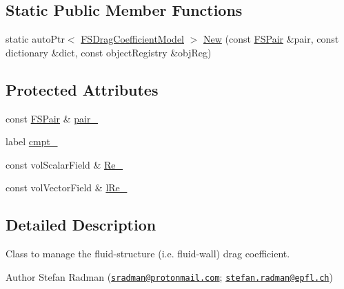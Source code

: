 \subsection*{Static Public Member Functions}
\begin{DoxyCompactItemize}
\item 
static auto\+Ptr$<$ \hyperlink{classFoam_1_1FSDragCoefficientModel}{F\+S\+Drag\+Coefficient\+Model} $>$ \hyperlink{classFoam_1_1FSDragCoefficientModel_a96a7d5b462837913e40f9e13072e927c}{New} (const \hyperlink{classFoam_1_1FSPair}{F\+S\+Pair} \&pair, const dictionary \&dict, const object\+Registry \&obj\+Reg)
\end{DoxyCompactItemize}
\subsection*{Protected Attributes}
\begin{DoxyCompactItemize}
\item 
const \hyperlink{classFoam_1_1FSPair}{F\+S\+Pair} \& \hyperlink{classFoam_1_1FSDragCoefficientModel_a587e19a1b4f4b498d2604d20c093a73b}{pair\+\_\+}
\item 
label \hyperlink{classFoam_1_1FSDragCoefficientModel_af2a0c78856a3dbdc3cb25d9e8e0ee0d7}{cmpt\+\_\+}
\item 
const vol\+Scalar\+Field \& \hyperlink{classFoam_1_1FSDragCoefficientModel_a048c59a4c6018dbef125c5d840ada714}{Re\+\_\+}
\item 
const vol\+Vector\+Field \& \hyperlink{classFoam_1_1FSDragCoefficientModel_a749dc262c8ea770eb61b5d6302d0a0c6}{l\+Re\+\_\+}
\end{DoxyCompactItemize}


\subsection{Detailed Description}
Class to manage the fluid-\/structure (i.\+e. fluid-\/wall) drag coefficient. 

\label{_Description}%
 Author Stefan Radman (\href{mailto:sradman@protonmail.com}{\tt sradman@protonmail.\+com}; \href{mailto:stefan.radman@epfl.ch}{\tt stefan.\+radman@epfl.\+ch})

